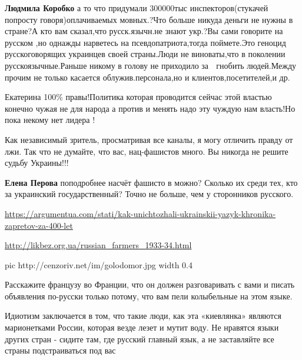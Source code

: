 \begin{itemize}
{\begin{itemize}
\textbf{Людмила Коробко} а то что придумали 300000тыс инспекторов(стукачей
попросту говоря)оплачиваемых мовных.?Что больше никуда деньги не нужны в
стране?А кто вам сказал,что русск.язычн.не знают укр.?Вы сами говорите на
русском ,но однажды нарветесь на псевдопатриота,тогда поймете.Это геноцид
русскоговорящих украинцев своей страны.Люди не виноваты,что в поколении
русскоязычные.Раньше никому в голову не приходило за 👅 гнобить людей.Между
прочим не только касается облужив.персонала,но и клиентов,посетителей,и др.
\end{itemize}

Екатерина 100\% правы!Политика которая проводится сейчас этой властью конечно
чужая не для народа а против и менять надо эту чуждую нам власть!Но пока некому
нет лидера !


Как независимый зритель, просматривая все каналы, я могу отличить правду от
лжи. Так что не думайте, что вас, нац-фашистов много. Вы никогда не решите
судьбу Украины!!!

\begin{itemize}
\textbf{Елена Перова} поподробнее насчёт фашисто в можно? Сколько их среди тех, кто за украинский государственный? Точно не больше, чем у сторонников русского.


\url{https://argumentua.com/stati/kak-unichtozhali-ukrainskii-yazyk-khronika-zapretov-za-400-let}\par
\url{http://likbez.org.ua/russian_farmers_1933-34.html}\par

\ifcmt
  pic http://cenzoriv.net/im/golodomor.jpg
  width 0.4
\fi

\end{itemize}


Расскажите французу во Франции, что он должен разговаривать с вами и писать
объявления по-русски только потому, что вам пели колыбельные на этом языке.

Идиотизм заключается в том, что такие люди, как эта «киевлянка» являются
марионетками России, которая везде лезет и мутит воду. Не нравятся языки других
стран - сидите там, где русский главный язык, а не заставляйте все страны
подстраиваться под вас

\begin{itemize}


\end{itemize}}
\end{itemize}
